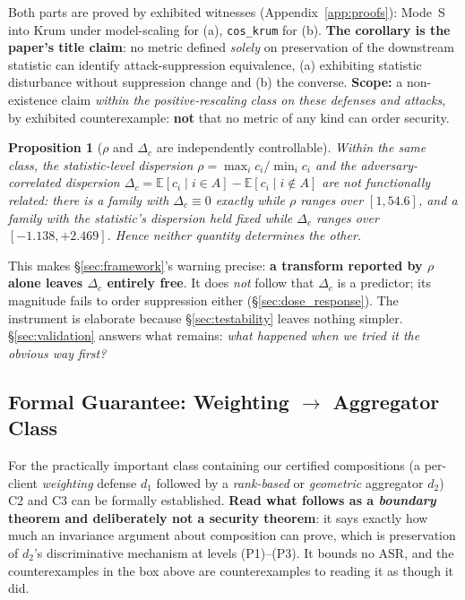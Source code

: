 \documentclass{article}
\newtheorem{proposition}{Proposition}
\begin{document}
\noindent Both parts are proved by exhibited witnesses (Appendix~\ref{app:proofs}): Mode~S into Krum under model-scaling for (a), \texttt{cos\_krum} for (b). \textbf{The corollary is the paper's title claim}: no metric defined \emph{solely} on preservation of the downstream statistic can identify attack-suppression equivalence, (a) exhibiting statistic disturbance without suppression change and (b) the converse. \textbf{Scope:} a non-existence claim \emph{within the positive-rescaling class on these defenses and attacks}, by exhibited counterexample: \textbf{not} that no metric of any kind can order security.

\begin{proposition}[$\rho$ and $\Delta_c$ are independently controllable]
\label{prop:rho_deltac}
Within the same class, the statistic-level dispersion $\rho = \max_i c_i/\min_i c_i$ and the adversary-correlated dispersion $\Delta_c = \mathbb{E}[c_i \mid i \in A] - \mathbb{E}[c_i \mid i \notin A]$ are not functionally related: there is a family with $\Delta_c \equiv 0$ exactly while $\rho$ ranges over $[1, 54.6]$, and a family with the statistic's dispersion held fixed while $\Delta_c$ ranges over $[-1.138, +2.469]$. Hence neither quantity determines the other.
\end{proposition}

\noindent This makes \S\ref{sec:framework}'s warning precise: \textbf{a transform reported by $\rho$ alone leaves $\Delta_c$ entirely free}. It does \emph{not} follow that $\Delta_c$ is a predictor; its magnitude fails to order suppression either (\S\ref{sec:dose_response}). The instrument is elaborate because \S\ref{sec:testability} leaves nothing simpler. \S\ref{sec:validation} answers what remains: \emph{what happened when we tried it the obvious way first?}

\subsection{Formal Guarantee: Weighting $\to$ Aggregator Class}

For the practically important class containing our certified compositions (a per-client \emph{weighting} defense $d_1$ followed by a \emph{rank-based} or \emph{geometric} aggregator $d_2$) C2 and C3 can be formally established. \textbf{Read what follows as a \emph{boundary} theorem and deliberately not a security theorem}: it says exactly how much an invariance argument about composition can prove, which is preservation of $d_2$'s discriminative mechanism at levels (P1)--(P3). It bounds no ASR, and the counterexamples in the box above are counterexamples to reading it as though it did.
\end{document}
